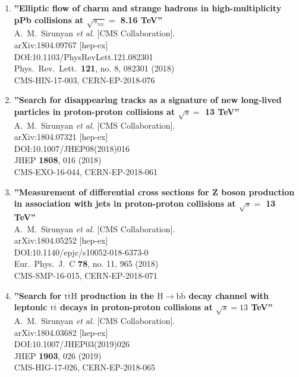 \begin{enumerate}
\item%
{\bf ''Elliptic flow of charm and strange hadrons in high-multiplicity pPb collisions at $\sqrt{s_{_\mathrm{NN}}} =$ 8.16 TeV''}
  \\{}A.~M.~Sirunyan {\it et al.} [CMS Collaboration].
  \\{}arXiv:1804.09767 [hep-ex]
  \\{}DOI:10.1103/PhysRevLett.121.082301
  \\{}Phys.\ Rev.\ Lett.\  {\bf 121}, no. 8, 082301 (2018)
  \\{}CMS-HIN-17-003, CERN-EP-2018-076

\item%
{\bf ''Search for disappearing tracks as a signature of new long-lived particles in proton-proton collisions at $\sqrt{s} =$ 13 TeV''}
  \\{}A.~M.~Sirunyan {\it et al.} [CMS Collaboration].
  \\{}arXiv:1804.07321 [hep-ex]
  \\{}DOI:10.1007/JHEP08(2018)016
  \\{}JHEP {\bf 1808}, 016 (2018)
  \\{}CMS-EXO-16-044, CERN-EP-2018-061

\item%
{\bf ''Measurement of differential cross sections for Z boson production in association with jets in proton-proton collisions at $\sqrt{s} =$ 13 TeV''}
  \\{}A.~M.~Sirunyan {\it et al.} [CMS Collaboration].
  \\{}arXiv:1804.05252 [hep-ex]
  \\{}DOI:10.1140/epjc/s10052-018-6373-0
  \\{}Eur.\ Phys.\ J.\ C {\bf 78}, no. 11, 965 (2018)
  \\{}CMS-SMP-16-015, CERN-EP-2018-071

\item%
{\bf ''Search for $ \mathrm{t}\overline{\mathrm{t}}\mathrm{H} $ production in the $ \mathrm{H}\to \mathrm{b}\overline{\mathrm{b}} $ decay channel with leptonic $ \mathrm{t}\overline{\mathrm{t}} $ decays in proton-proton collisions at $ \sqrt{s}=13 $ TeV''}
  \\{}A.~M.~Sirunyan {\it et al.} [CMS Collaboration].
  \\{}arXiv:1804.03682 [hep-ex]
  \\{}DOI:10.1007/JHEP03(2019)026
  \\{}JHEP {\bf 1903}, 026 (2019)
  \\{}CMS-HIG-17-026, CERN-EP-2018-065


\end{enumerate}
